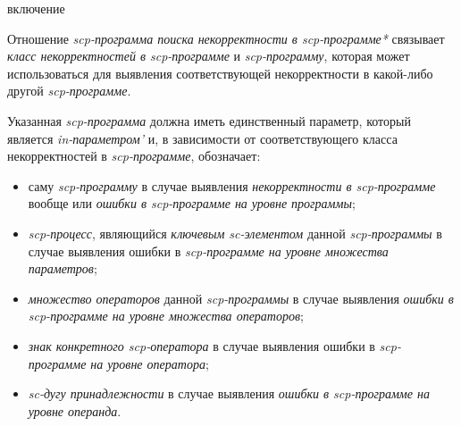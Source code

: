 \begin{SCn}
\begin{scnrelfromlist}{включение}
    \begin{scnindent}
    \end{scnindent}
\end{scnrelfromlist}

\end{SCn}

Отношение \textit{scp-программа поиска некорректности в scp-программе*} связывает \textit{класс некорректностей в scp-программе} и \textit{scp-программу}, которая может использоваться для выявления соответствующей некорректности в какой-либо другой \textit{scp-программе}. 

Указанная \textit{scp-программа} должна иметь единственный параметр, который является \textit{in-параметром’} и, в зависимости от соответствующего класса некорректностей в \textit{scp-программе}, обозначает:

\begin{itemize}
    \item саму \textit{scp-программу} в случае выявления \textit{некорректности в scp-программе} вообще или \textit{ошибки в scp-программе на уровне программы};
    \item \textit{scp-процесс}, являющийся \textit{ключевым sc-элементом} данной \textit{scp-программы} в случае выявления ошибки в \textit{scp-программе на уровне множества параметров};
    \item \textit{множество операторов} данной \textit{scp-программы} в случае выявления \textit{ошибки в scp-программе на уровне множества операторов};
    \item \textit{знак конкретного scp-оператора} в случае выявления ошибки в \textit{scp-программе на уровне оператора};
    \item \textit{sc-дугу принадлежности} в случае выявления \textit{ошибки в scp-программе на уровне операнда}.
\end{itemize}

